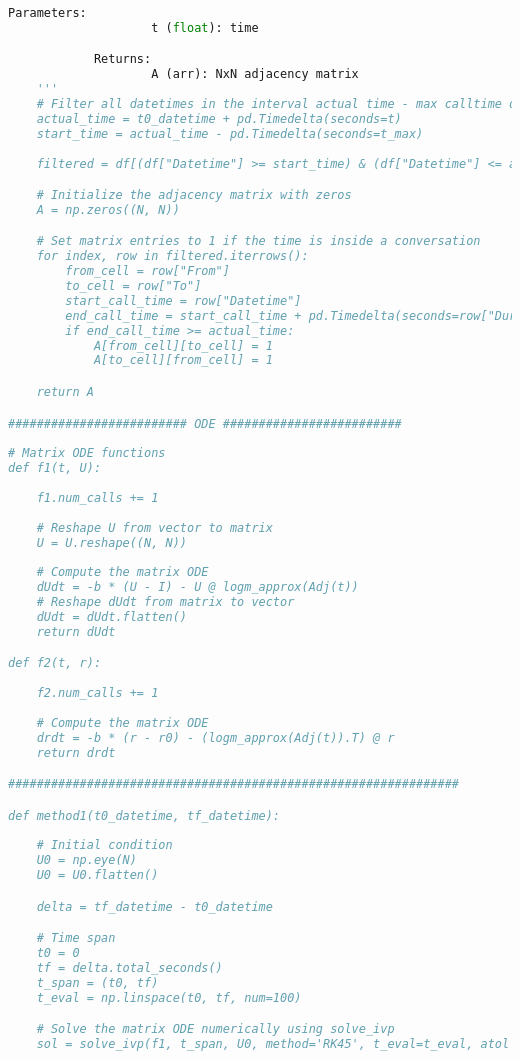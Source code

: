 \begin{lstlisting}[language=Python, caption=$\mathbf{b}(t)$ vs. $\mathbf{r}(t)$ cost comparison]
            Parameters:
                    t (float): time

            Returns:
                    A (arr): NxN adjacency matrix
    '''
    # Filter all datetimes in the interval actual time - max calltime duration
    actual_time = t0_datetime + pd.Timedelta(seconds=t)
    start_time = actual_time - pd.Timedelta(seconds=t_max)
    
    filtered = df[(df["Datetime"] >= start_time) & (df["Datetime"] <= actual_time)]

    # Initialize the adjacency matrix with zeros
    A = np.zeros((N, N))

    # Set matrix entries to 1 if the time is inside a conversation
    for index, row in filtered.iterrows():
        from_cell = row["From"]
        to_cell = row["To"]
        start_call_time = row["Datetime"]
        end_call_time = start_call_time + pd.Timedelta(seconds=row["Duration(seconds)"])
        if end_call_time >= actual_time:
            A[from_cell][to_cell] = 1
            A[to_cell][from_cell] = 1

    return A

######################### ODE #########################
    
# Matrix ODE functions
def f1(t, U):
    
    f1.num_calls += 1
    
    # Reshape U from vector to matrix
    U = U.reshape((N, N))
    
    # Compute the matrix ODE
    dUdt = -b * (U - I) - U @ logm_approx(Adj(t))
    # Reshape dUdt from matrix to vector
    dUdt = dUdt.flatten()
    return dUdt

def f2(t, r):
    
    f2.num_calls += 1
    
    # Compute the matrix ODE
    drdt = -b * (r - r0) - (logm_approx(Adj(t)).T) @ r
    return drdt

###############################################################

def method1(t0_datetime, tf_datetime):
    
    # Initial condition 
    U0 = np.eye(N)
    U0 = U0.flatten()

    delta = tf_datetime - t0_datetime

    # Time span
    t0 = 0
    tf = delta.total_seconds() 
    t_span = (t0, tf) 
    t_eval = np.linspace(t0, tf, num=100)

    # Solve the matrix ODE numerically using solve_ivp
    sol = solve_ivp(f1, t_span, U0, method='RK45', t_eval=t_eval, atol = ATOL, rtol = RTOL)
    

\end{lstlisting}
